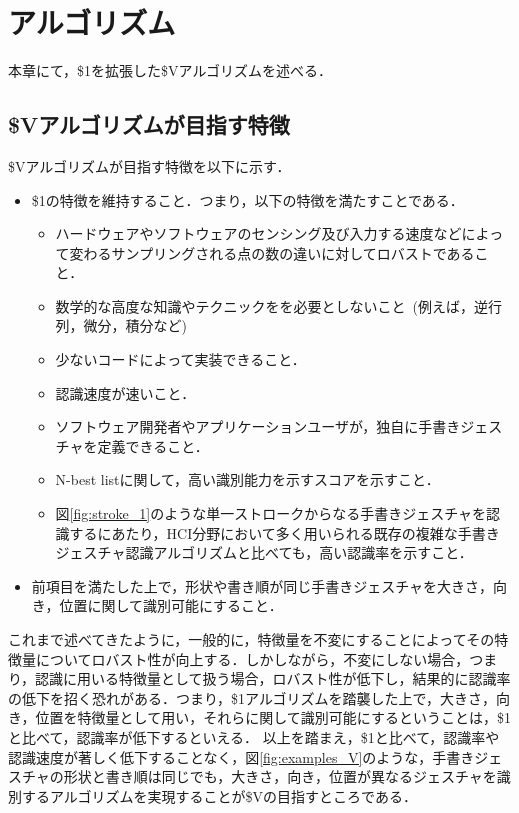 \chapter{\SysName アルゴリズム}
本章にて，\$1を拡張した\$Vアルゴリズムを述べる．

\section{\$Vアルゴリズムが目指す特徴}
\$Vアルゴリズムが目指す特徴を以下に示す．
\begin{itemize}
\item \$1の特徴を維持すること．つまり，以下の特徴を満たすことである．
\begin{itemize}
\item ハードウェアやソフトウェアのセンシング及び入力する速度などによって変わるサンプリングされる点の数の違いに対してロバストであること．
\item 数学的な高度な知識やテクニックをを必要としないこと~(例えば，逆行列，微分，積分など)
\item 少ないコードによって実装できること．
\item 認識速度が速いこと．
\item ソフトウェア開発者やアプリケーションユーザが，独自に手書きジェスチャを定義できること．
\item N-best listに関して，高い識別能力を示すスコアを示すこと．
\item 図\ref{fig:stroke_1}のような単一ストロークからなる手書きジェスチャを認識するにあたり，HCI分野において多く用いられる既存の複雑な手書きジェスチャ認識アルゴリズムと比べても，高い認識率を示すこと．
\end{itemize}
\item 前項目を満たした上で，形状や書き順が同じ手書きジェスチャを大きさ，向き，位置に関して識別可能にすること．
\end{itemize}

これまで述べてきたように，一般的に，特徴量を不変にすることによってその特徴量についてロバスト性が向上する．しかしながら，不変にしない場合，つまり，認識に用いる特徴量として扱う場合，ロバスト性が低下し，結果的に認識率の低下を招く恐れがある．つまり，\$1アルゴリズムを踏襲した上で，大きさ，向き，位置を特徴量として用い，それらに関して識別可能にするということは，\$1と比べて，認識率が低下するといえる．
以上を踏まえ，\$1と比べて，認識率や認識速度が著しく低下することなく，図\ref{fig:examples_V}のような，手書きジェスチャの形状と書き順は同じでも，大きさ，向き，位置が異なるジェスチャを識別するアルゴリズムを実現することが\$Vの目指すところである．

